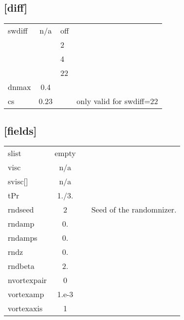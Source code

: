 \documentclass[a4paper,10pt]{extarticle}
\begin{document}
\subsection*{[diff]}
\tablelasttail{\hline}
\begin{supertabular}{lcll}
swdiff        & n/a   & off\\
              &       & 2  \\
              &       & 4  \\
              &       & 22 \\
dnmax         & 0.4   & \\
cs            & 0.23  &  & only valid for swdiff=22 \\
\end{supertabular}
\subsection*{[fields]}
\tablelasttail{\hline}
\begin{supertabular}{lcll}
slist         & empty & \\
visc          & n/a   & \\
svisc[]       & n/a   & \\
tPr           & 1./3. & \\
rndseed       & 2     & & Seed of the randomnizer. \\
rndamp        & 0.    & \\
rndamps       & 0.    & \\
rndz          & 0.    & \\
rndbeta       & 2.    & \\
nvortexpair   & 0     & \\
vortexamp     & 1.e-3 & \\
vortexaxis    & 1     & \\
\end{supertabular}
\end{document}
